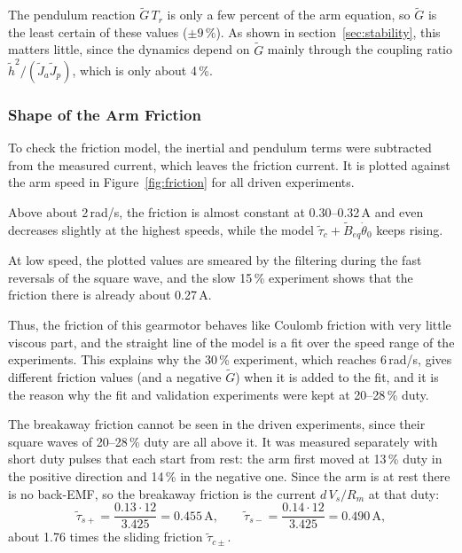 \documentclass[a4paper,11pt]{article}
\begin{document}
The pendulum reaction $\tilde G\, T_r$ is only a few percent of the arm equation, so $\tilde G$ is the least certain of these values ($\pm 9\,\%$). As shown in section~\ref{sec:stability}, this matters little, since the dynamics depend on $\tilde G$ mainly through the coupling ratio $\tilde h^2/(\tilde J_a \tilde J_p)$, which is only about 4\,\%.

\subsubsection{Shape of the Arm Friction}
To check the friction model, the inertial and pendulum terms were subtracted from the measured current, which leaves the friction current. It is plotted against the arm speed in Figure~\ref{fig:friction} for all driven experiments.

Above about 2\,rad/s, the friction is almost constant at 0.30--0.32\,A and even decreases slightly at the highest speeds, while the model $\tilde\tau_c + \tilde B_{eq}\dot\theta_0$ keeps rising.

At low speed, the plotted values are smeared by the filtering during the fast reversals of the square wave, and the slow 15\,\% experiment shows that the friction there is already about 0.27\,A.

Thus, the friction of this gearmotor behaves like Coulomb friction with very little viscous part, and the straight line of the model is a fit over the speed range of the experiments. This explains why the 30\,\% experiment, which reaches 6\,rad/s, gives different friction values (and a negative $\tilde G$) when it is added to the fit, and it is the reason why the fit and validation experiments were kept at 20--28\,\% duty.

The breakaway friction cannot be seen in the driven experiments, since their square waves of 20--28\,\% duty are all above it. It was measured separately with short duty pulses that each start from rest: the arm first moved at 13\,\% duty in the positive direction and 14\,\% in the negative one. Since the arm is at rest there is no back-EMF, so the breakaway friction is the current $d\,V_s/R_m$ at that duty:
\begin{equation}
  \tilde\tau_{s+} = \frac{0.13 \cdot 12}{3.425} = 0.455\,\mathrm{A}, \qquad \tilde\tau_{s-} = \frac{0.14 \cdot 12}{3.425} = 0.490\,\mathrm{A},
  \label{eq:breakaway}
\end{equation}
about 1.76 times the sliding friction $\tilde\tau_{c\pm}$.
\end{document}
